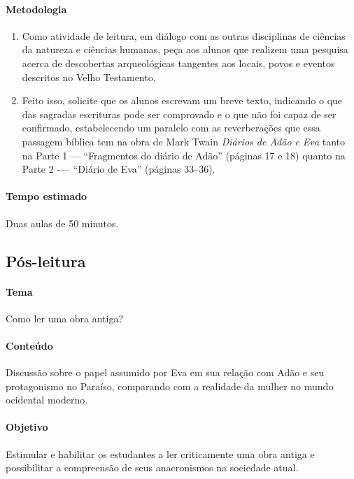 \documentclass[12pt]{extarticle}
\begin{document}
\paragraph{Metodologia}

\begin{enumerate}
\item
Como atividade de leitura, em diálogo com as outras disciplinas de ciências da natureza e 
ciências humanas, peça aos alunos que realizem uma pesquisa acerca de descobertas 
arqueológicas tangentes aos locais, povos e eventos descritos no Velho Testamento. 


\item
Feito isso, solicite que os alunos escrevam um breve texto, indicando o que 
das sagradas escrituras pode ser comprovado e o que não foi capaz de ser confirmado, 
estabelecendo um paralelo com as reverberações que essa passagem bíblica tem na obra 
de Mark Twain \emph{Diários de Adão e Eva} tanto na Parte 1 --- 
``Fragmentos do diário de Adão'' (páginas 17 e 18)
quanto na Parte 2 -— ``Diário de Eva'' (páginas 33--36).

\end{enumerate}

\paragraph{Tempo estimado} Duas aulas de 50 minutos. 

\subsection{Pós-leitura}

\paragraph{Tema} Como ler uma obra antiga? 

\paragraph{Conteúdo} Discussão sobre o papel assumido por Eva em sua relação com Adão e seu 
protagonismo no Paraíso, comparando com a realidade da mulher no mundo ocidental moderno.

\paragraph{Objetivo} Estimular e habilitar os estudantes a ler criticamente uma obra 
antiga e possibilitar a compreensão de seus anacronismos na sociedade atual. 
\end{document}
